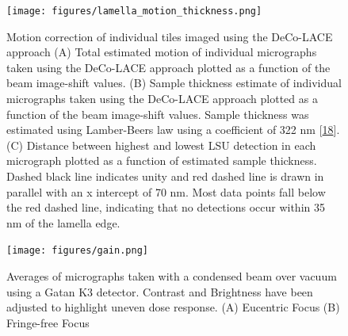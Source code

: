 \documentclass[
]{article}
\newenvironment{fignos:tagged-figure}[1][]{
    \let\oldthefigure\thefigure
    \let\oldtheHfigure\theHfigure
    \renewcommand{\thefigure}{#1}
    \renewcommand{\theHfigure}{#1}
  }{
    \let\thefigure\oldthefigure
    \let\theHfigure\oldtheHfigure
    \addtocounter{figure}{-1}
  }
\providecommand{\DIFaddbegin}{} %
\providecommand{\DIFaddend}{} %
\providecommand{\DIFdelbegin}{} %
\providecommand{\DIFdelend}{} %
\providecommand{\DIFaddbeginFL}{} %
\providecommand{\DIFaddendFL}{} %
\providecommand{\DIFdelbeginFL}{} %
\providecommand{\DIFdelendFL}{} %
\newcommand{\DIFscaledelfig}{0.5}
\newlength{\DIFdelgraphicswidth} %
\newlength{\DIFdelgraphicsheight} %
\newcommand{\DIFaddincludegraphics}[2][]{{\color{blue}\fbox{\DIFOincludegraphics[#1]{#2}}}} %
\newcommand{\DIFdelincludegraphics}[2][]{%
\sbox{\DIFdelgraphicsbox}{\DIFOincludegraphics[#1]{#2}}%
\settoboxwidth{\DIFdelgraphicswidth}{\DIFdelgraphicsbox} %
\settoboxtotalheight{\DIFdelgraphicsheight}{\DIFdelgraphicsbox} %
\scalebox{\DIFscaledelfig}{%
\parbox[b]{\DIFdelgraphicswidth}{\usebox{\DIFdelgraphicsbox}\\[-\baselineskip] \rule{\DIFdelgraphicswidth}{0em}}\llap{\resizebox{\DIFdelgraphicswidth}{\DIFdelgraphicsheight}{%
\setlength{\unitlength}{\DIFdelgraphicswidth}%
\begin{picture}(1,1)%
\thicklines\linethickness{2pt} %
{\color[rgb]{1,0,0}\put(0,0){\framebox(1,1){}}}%
{\color[rgb]{1,0,0}\put(0,0){\line( 1,1){1}}}%
{\color[rgb]{1,0,0}\put(0,1){\line(1,-1){1}}}%
\end{picture}%
}\hspace*{3pt}}} %
} %
\DeclareRobustCommand{\DIFaddbegin}{\DIFOaddbegin \let\includegraphics\DIFaddincludegraphics} %
\DeclareRobustCommand{\DIFaddend}{\DIFOaddend \let\includegraphics\DIFOincludegraphics} %
\DeclareRobustCommand{\DIFdelbegin}{\DIFOdelbegin \let\includegraphics\DIFdelincludegraphics} %
\DeclareRobustCommand{\DIFdelend}{\DIFOaddend \let\includegraphics\DIFOincludegraphics} %
\DeclareRobustCommand{\DIFaddbeginFL}{\DIFOaddbeginFL \let\includegraphics\DIFaddincludegraphics} %
\DeclareRobustCommand{\DIFaddendFL}{\DIFOaddendFL \let\includegraphics\DIFOincludegraphics} %
\DeclareRobustCommand{\DIFdelbeginFL}{\DIFOdelbeginFL \let\includegraphics\DIFdelincludegraphics} %
\DeclareRobustCommand{\DIFdelendFL}{\DIFOaddendFL \let\includegraphics\DIFOincludegraphics} %
\begin{document}
\DIFdelbegin %
\DIFdelend \DIFaddbegin \begin{fignos:tagged-figure}
\DIFaddend 

\begin{figure}
\DIFdelbeginFL %
\DIFdelendFL \DIFaddbeginFL \hypertarget{fig:lamella_motion_thickness}{%
\centering
\texttt{[image: figures/lamella\_motion\_thickness.png]}
\caption{Motion correction of individual tiles imaged using the DeCo-LACE
approach (A) Total estimated motion of individual micrographs taken
using the DeCo-LACE approach plotted as a function of the beam
image-shift values. (B) Sample thickness estimate of individual
micrographs taken using the DeCo-LACE approach plotted as a function of
the beam image-shift values. Sample thickness was estimated using
Lamber-Beers law using a coefficient of 322 nm
{[}\protect\hyperlink{ref-17IP4Lhz1}{18}{]}. (C) Distance between highest and
lowest LSU detection in each micrograph plotted as a function of
estimated sample thickness. Dashed black line indicates unity and red
dashed line is drawn in parallel with an x intercept of 70 nm. Most data
points fall below the red dashed line, indicating that no detections
occur within 35 nm of the lamella
edge.}\label{fig:lamella_motion_thickness}
}
\DIFaddendFL \end{figure}

\end{fignos:tagged-figure}

\DIFdelbegin %
\DIFdelend \DIFaddbegin \begin{fignos:tagged-figure}
\DIFaddend 

\begin{figure}
\hypertarget{fig:gain}{%
\centering
\texttt{[image: figures/gain.png]}
\caption{Averages of micrographs taken with a condensed beam over vacuum using
a Gatan K3 detector. Contrast and Brightness have been adjusted to
highlight uneven dose response. (A) Eucentric Focus (B) Fringe-free
Focus}\label{fig:gain}
}
\end{figure}

\end{fignos:tagged-figure}
\end{document}
